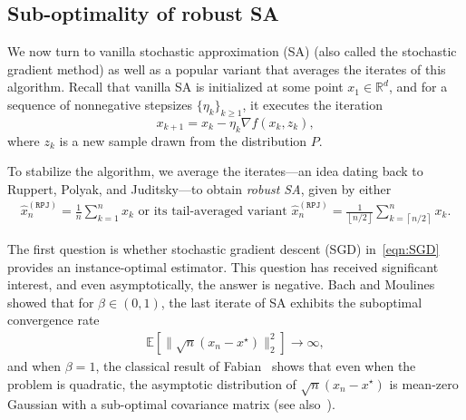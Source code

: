 \documentclass[11pt,twoside]{article}
\numberwithin{equation}{section}
\newcommand{\EE}{\mathbb{E}}
\newcommand{\ceil}[1]{\left \lceil #1 \right \rceil }
\newcommand{\floor}[1]{\left \lfloor #1 \right \rfloor }
\newcommand{\1}{\mathbf{1}}
\theoremstyle{remark}
\theoremstyle{plain}
\newcommand{\rpj}{\widehat x_n^{(\texttt{RPJ})}}
\begin{document}
\subsection{Sub-optimality of robust SA}\label{sec:suboptimality_of_SA}

We now turn to vanilla stochastic approximation (SA) (also called the stochastic gradient method) as well as a popular variant that averages the iterates of this algorithm. Recall that vanilla SA is initialized at some point $x_1 \in \mathbb{R}^d$, and for a sequence of nonnegative stepsizes $\{\eta_k\}_{k \geq 1}$, it executes the iteration
\begin{equation}\label{eqn:SGD}
x_{k+1} =x_k - \eta_k \nabla f(x_k, z_k),
\end{equation} 
where $z_k$ is a new sample drawn from the distribution $P$.

To stabilize the algorithm, we average the iterates---an idea dating back to Ruppert, Polyak, and Juditsky---to obtain \emph{robust SA}, given by either
\begin{align}
\rpj = \frac{1}{n}\sum_{k=1}^{n} x_k \text{ or its tail-averaged variant } \rpj = \frac{1}{\floor{n/2}}\sum_{k=\ceil{n/2}}^{n} x_k.
\end{align}

The first question is whether stochastic gradient descent (SGD) in~\eqref{eqn:SGD} provides an instance-optimal estimator. This question has received significant interest, and even asymptotically, the answer is negative. Bach and Moulines~\cite[Theorem 2]{moulines2011non} showed that for $\beta \in (0,1)$, the last iterate of SA exhibits the suboptimal convergence rate
\begin{align*}
\EE[\|\sqrt{n}(x_n - x^\star)\|_2^2] \rightarrow \infty,
\end{align*}
and when $\beta = 1$, the classical result of Fabian~\cite[Theorem 3.4]{fabian1968asymptotic} shows that even when the problem is quadratic, the asymptotic distribution of $\sqrt{n}(x_n - x^\star)$ is mean-zero Gaussian with a sub-optimal covariance matrix (see also~\cite{benveniste2012adaptive}). %
\end{document}
